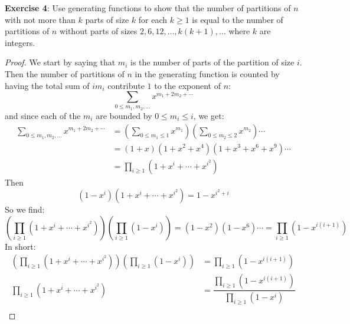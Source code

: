 \documentclass{article}
\begin{document}
\textbf{Exercise 4}: Use generating functions to show that the number of partitions of $n$ with not more than $k$ parts of size $k$ for each $k \geq 1$ is equal to the number of partitions of $n$ without parts of sizes $2, 6, 12, \ldots , k(k + 1), \ldots $ where $k$ are integers.
    \begin{proof}
        We start by saying that $m_{i}$ is the number of parts of the partition of size $i$. Then the number of partitions of $n$ in the generating function is counted by having the total sum of $im_{i}$ contribute $1$ to the exponent of $n$:
            \begin{equation*}
                \sum_{0 \leq m_{1}, m_{2}, \ldots }x^{m_{1} + 2m_{2} + \cdots }
            \end{equation*}
        and since each of the $m_{i}$ are bounded by $0 \leq m_{i} \leq i$, we get:
            \begin{align*}
                \sum_{0 \leq m_{1}, m_{2}, \ldots }x^{m_{1} + 2m_{2} + \cdots } &= \left(\sum_{0 \leq m_{1} \leq 1}x^{m_{1}}\right)\left(\sum_{0 \leq m_{2} \leq 2}x^{m_{2}}\right)\cdots  \\
                                                                                &= (1 + x)(1 + x^{2} + x^{4})(1 + x^{3} + x^{6} + x^{9})\cdots                                             \\
                                                                                &= \prod_{i \geq 1}(1 + x^{i} + \cdots + x^{i^{2}})                                                          
            \end{align*}
        Then 
            \begin{equation*}
                (1 - x^{i})(1 + x^{i} + \cdots +x^{i^{2}}) = 1 - x^{i^{2} + i}
            \end{equation*}
        So we find:
            \begin{equation*}
                \left(\prod_{i \geq 1}(1 + x^{i} + \cdots +x^{i^{2}})\right)\left(\prod_{i \geq 1}(1 - x^{i})\right) = (1 - x^{2})(1 - x^{6})\cdots  = \prod_{i \geq 1}(1 - x^{i(i + 1)})
            \end{equation*}
        In short:
            \begin{align*}
                \left(\prod_{i \geq 1}(1 + x^{i} + \cdots +x^{i^{2}})\right)\left(\prod_{i \geq 1}(1 - x^{i})\right) &= \prod_{i \geq 1}(1 - x^{i(i + 1)})                                      \\
                \prod_{i\geq 1}(1 + x^{i} + \cdots + x^{i^{2}})                                                      &= \dfrac{\prod_{i \geq 1}(1 - x^{i(i + 1)})}{\prod_{i \geq 1}(1 - x^{i})} \\

\end{align*}
\end{proof}
\end{document}
